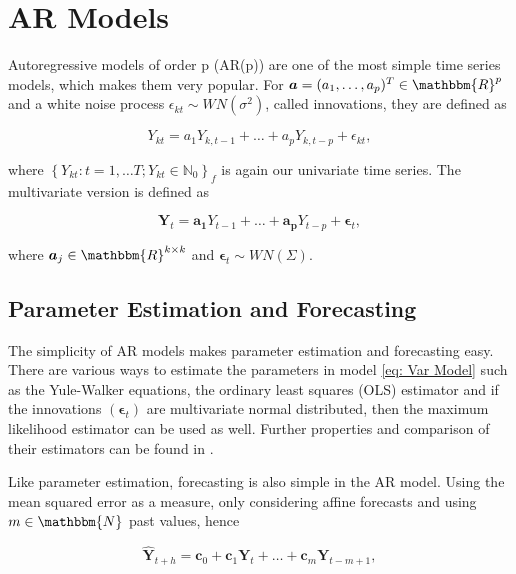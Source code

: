 \section{AR Models}
\label{sec: Ar Models}

Autoregressive models of order p (AR(p))  are one of the most simple time series models, which makes them very popular. For $\bm{a}=(a_1,\ldots,a_p)^T \in \mathbbm{R}^p$ and a white noise process $\epsilon_{kt} \sim WN(\sigma^2)$, called innovations, they are defined as 

\begin{equation}
Y_{kt} = a_1Y_{k,t-1} + \ldots + a_pY_{k,t-p} + \epsilon_{kt},
\label{eq: Ar model}
\end{equation}

where $\left\{Y_{kt}:t=1,\ldots T; Y_{kt} \in \mathbb{N}_0\right\}_f$ is again our univariate time series. The multivariate version is defined as 

\begin{equation}
\bm{Y}_{t} = \bm{a_1}Y_{t-1} + \ldots + \bm{a_p}Y_{t-p} + \bm{\epsilon}_{t},
\label{eq: Var Model}
\end{equation}

where $\bm{a}_j \in \mathbbm{R}^{k \times k}$ and $\bm{\epsilon}_t \sim WN(\Sigma)$.%

\subsection{Parameter Estimation and Forecasting}
\label{sec: AR Estimation and Forecasting}

The simplicity of AR models makes parameter estimation and forecasting easy. There are various ways to estimate the parameters in model \ref{eq: Var Model} such as the Yule-Walker equations, the ordinary least squares (OLS) estimator and if the innovations $(\bm{\epsilon}_t)$ are multivariate normal distributed, then the maximum likelihood estimator can be used as well. Further properties and comparison of their estimators can be found in \cite{Scherrer:2021}. 

Like parameter estimation, forecasting is also simple in the AR model. Using the mean squared error as a measure, only considering affine forecasts and using $m \in \mathbbm{N}$ past values, hence 

\begin{equation}
\hat{\bm{Y}}_{t+h} = \bm{c}_0 + \bm{c}_1\bm{Y}_{t} + \ldots + \bm{c}_m\bm{Y}_{t-m+1},
\label{eq:Forecasting general}
\end{equation}

